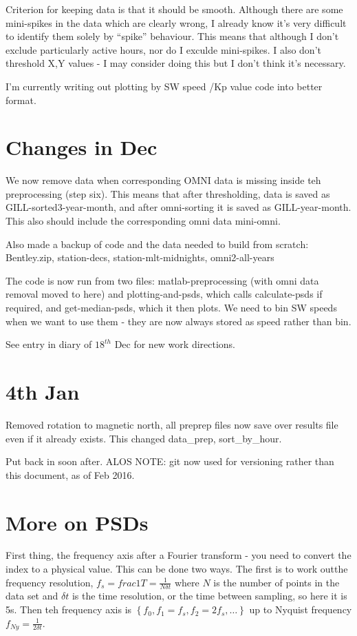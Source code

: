 \documentclass[11pt]{article}
\begin{document}
Criterion for keeping data is that it should be smooth. Although there are some mini-spikes in the
data which are clearly wrong, I already know it's very difficult to identify them solely by
``spike'' behaviour. This means that although I don't exclude particularly active hours, nor do I
exculde mini-spikes. I also don't threshold X,Y values - I may consider doing this but I don't
think it's necessary.

I'm currently writing out plotting by SW speed /Kp value code into better format.


\section{Changes in Dec}
We now remove data when corresponding OMNI data is missing inside teh preprocessing (step
six). This means that after thresholding, data is saved as GILL-sorted3-year-month, and after
omni-sorting it is saved as GILL-year-month. This also should include the corresponding omni data
mini-omni.

Also made a backup of code and the data needed to build from scratch: Bentley.zip,
station-decs, station-mlt-midnights, omni2-all-years

The code is now run from two files: matlab-preprocessing (with omni data removal moved to here)
and plotting-and-psds, which calls calculate-psds if required, and get-median-psds, which it
then plots. We need to bin SW speeds when we want to use them - they are now always stored as
speed rather than bin.

See entry in diary of $18^{th}$ Dec for new work directions.

\section{4th Jan}
Removed rotation to magnetic north, all preprep files now save over results file even if it already
exists. This changed data\_prep, sort\_by\_hour.

Put back in soon after. ALOS NOTE: git now used for versioning rather than this document, as of Feb
2016.


\section{More on PSDs}
First thing, the frequency axis after a Fourier transform - you need to convert the index to a
physical value. This can be done two ways. The first is to work outthe frequency resolution, $f_s =
frac{1}{T} = \frac{1}{N \delta t} $ where $N$ is the number of points in the data set and $\delta t$ is the time
resolution, or the time between sampling, so here it is 5s. Then teh frequency axis is $\left\{
f_0,f_1 = f_s, f_2 = 2 f_s, \ldots \right\}$ up to Nyquist frequency $f_{Ny} = \frac{1}{2 \delta
t}$.
\end{document}
